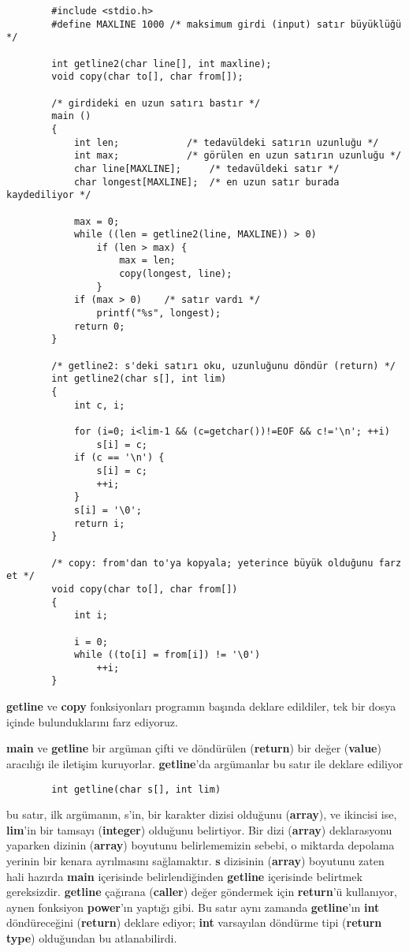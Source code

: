 \documentclass[a4paper,12pt,oneside]{book}
\begin{document}
\begin{samepage}
\begin{lstlisting}
		#include <stdio.h>
		#define MAXLINE 1000 /* maksimum girdi (input) satır büyüklüğü */

		int getline2(char line[], int maxline);
		void copy(char to[], char from[]);

		/* girdideki en uzun satırı bastır */
		main ()
		{
			int len;			/* tedavüldeki satırın uzunluğu */
			int max;			/* görülen en uzun satırın uzunluğu */
			char line[MAXLINE];		/* tedavüldeki satır */
			char longest[MAXLINE];	/* en uzun satır burada kaydediliyor */

			max = 0;
			while ((len = getline2(line, MAXLINE)) > 0)
				if (len > max) {
					max = len;
					copy(longest, line);
				}
			if (max > 0)	/* satır vardı */
				printf("%s", longest);
			return 0;
		}

		/* getline2: s'deki satırı oku, uzunluğunu döndür (return) */
		int getline2(char s[], int lim)
		{
			int c, i;

			for (i=0; i<lim-1 && (c=getchar())!=EOF && c!='\n'; ++i)
				s[i] = c;
			if (c == '\n') {
				s[i] = c;
				++i;
			}
			s[i] = '\0';
			return i;
		}

		/* copy: from'dan to'ya kopyala; yeterince büyük olduğunu farz et */
		void copy(char to[], char from[])
		{
			int i;

			i = 0;
			while ((to[i] = from[i]) != '\0')
				++i;
		}
\end{lstlisting}
\end{samepage} \pagebreak
\textbf{getline} ve \textbf{copy} fonksiyonları programın başında deklare edildiler, tek bir dosya içinde bulunduklarını farz ediyoruz.
\par \textbf{main} ve \textbf{getline} bir argüman çifti ve döndürülen (\textbf{return}) bir değer (\textbf{value}) aracılığı ile iletişim kuruyorlar. \textbf{getline}'da argümanlar bu satır ile deklare ediliyor
\begin{lstlisting}
		int getline(char s[], int lim)
\end{lstlisting}
bu satır, ilk argümanın, s'in, bir karakter dizisi olduğunu (\textbf{array}), ve ikincisi ise, \textbf{lim}'in bir tamsayı (\textbf{integer}) olduğunu belirtiyor. Bir dizi (\textbf{array}) deklarasyonu yaparken dizinin (\textbf{array}) boyutunu belirlememizin sebebi, o miktarda depolama yerinin bir kenara ayrılmasını sağlamaktır. \textbf{s} dizisinin (\textbf{array}) boyutunu zaten hali hazırda \textbf{main} içerisinde belirlendiğinden \textbf{getline} içerisinde belirtmek gereksizdir. \textbf{getline} çağırana (\textbf{caller}) değer göndermek için \textbf{return}'ü kullanıyor, aynen fonksiyon \textbf{power}'ın yaptığı gibi. Bu satır aynı zamanda \textbf{getline}'ın \textbf{int} döndüreceğini (\textbf{return}) deklare ediyor; \textbf{int} varsayılan döndürme tipi (\textbf{return type}) olduğundan bu atlanabilirdi.
\end{document}
